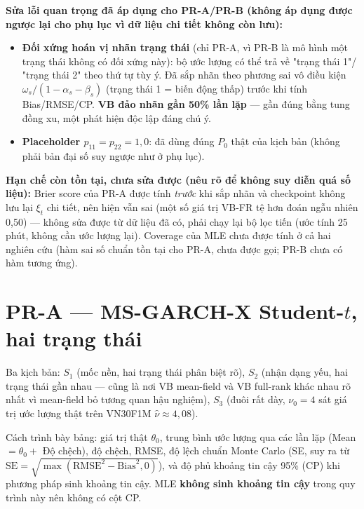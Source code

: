 \documentclass[11pt,a4paper]{article}
\begin{document}
\textbf{Sửa lỗi quan trọng đã áp dụng cho PR-A/PR-B (không áp dụng được ngược lại
cho phụ lục vì dữ liệu chi tiết không còn lưu):}
\begin{itemize}
\item \textbf{Đối xứng hoán vị nhãn trạng thái} (chỉ PR-A, vì PR-B là mô hình một
  trạng thái không có đối xứng này): bộ ước lượng có thể trả về "trạng thái 1"/
  "trạng thái 2" theo thứ tự tùy ý. Đã sắp nhãn theo phương sai vô điều kiện
  $\omega_s/(1-\alpha_s-\beta_s)$ (trạng thái 1 = biến động thấp) trước khi tính
  Bias/RMSE/CP. \textbf{VB đảo nhãn gần 50\% lần lặp} --- gần đúng bằng tung đồng
  xu, một phát hiện độc lập đáng chú ý.
\item \textbf{Placeholder $p_{11}=p_{22}=1{,}0$}: đã dùng đúng $P_0$ thật của kịch
  bản (không phải bản đại số suy ngược như ở phụ lục).
\end{itemize}

\textbf{Hạn chế còn tồn tại, chưa sửa được (nêu rõ để không suy diễn quá số liệu):}
Brier score của PR-A được tính \emph{trước} khi sắp nhãn và checkpoint không lưu
lại $\xi_t$ chi tiết, nên hiện vẫn sai (một số giá trị VB-FR tệ hơn đoán ngẫu
nhiên 0,50) --- không sửa được từ dữ liệu đã có, phải chạy lại bộ lọc tiến
(ước tính 25 phút, không cần ước lượng lại). Coverage của MLE chưa được tính ở
cả hai nghiên cứu (hàm sai số chuẩn tồn tại cho PR-A, chưa được gọi; PR-B chưa có
hàm tương ứng).

\clearpage
\section{PR-A --- MS-GARCH-X Student-$t$, hai trạng thái}

Ba kịch bản: $S_1$ (mốc nền, hai trạng thái phân biệt rõ), $S_2$ (nhận dạng yếu,
hai trạng thái gần nhau --- cũng là nơi VB mean-field và VB full-rank khác nhau rõ
nhất vì mean-field bỏ tương quan hậu nghiệm), $S_3$ (đuôi rất dày, $\nu_0=4$ sát
giá trị ước lượng thật trên VN30F1M $\hat\nu\approx4{,}08$).

Cách trình bày bảng: giá trị thật $\theta_0$, trung bình ước lượng qua các lần
lặp (Mean $=\theta_0+$ Độ chệch), độ chệch, RMSE, độ lệch chuẩn Monte Carlo (SE,
suy ra từ $\mathrm{SE}=\sqrt{\max(\mathrm{RMSE}^2-\mathrm{Bias}^2,0)}$), và độ
phủ khoảng tin cậy 95\% (CP) khi phương pháp sinh khoảng tin cậy. MLE
\textbf{không sinh khoảng tin cậy} trong quy trình này nên không có cột CP.
\end{document}
